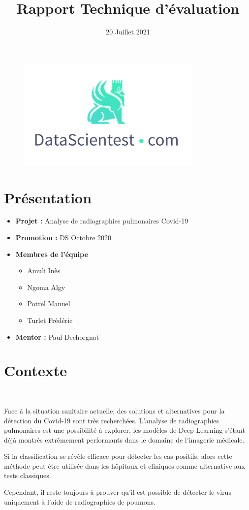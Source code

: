 \documentclass{article}
\title{Rapport Technique d'évaluation}
\date{20 Juillet 2021}
\begin{document}
\maketitle

\begin{figure}[!t] 
    \center 
    \includegraphics{banniere.png} 
\end{figure}

	\section*{Présentation}

	\begin{itemize}	
	
		\item \textbf{Projet :} Analyse de radiographies pulmonaires Covid-19
	
		\item \textbf{Promotion :} DS Octobre 2020
				
		\item \textbf{Membres de l'équipe}
			
		\begin{itemize}
			\item Amuli Inès
			\item Ngoma Algy
			\item Potrel Manuel
			\item Turlet Frédéric
		\end{itemize}
		
		\item \textbf{Mentor :} Paul Dechorgnat
		
	\end{itemize}
	
	\newpage	
	\section*{Contexte}
	
	~ 
	\par Face à la situation sanitaire actuelle, des solutions et alternatives pour la détection du Covid-19 sont très recherchées. L'analyse de radiographies pulmonaires est une possibilité à explorer, les modèles de Deep Learning s'étant déjà montrés extrêmement performants dans le domaine de l'imagerie médicale.
	\par Si la classification se révèle efficace pour détecter les cas positifs, alors cette méthode peut être utilisée dans les hôpitaux et cliniques comme alternative aux tests classiques.
	\par Cependant, il reste toujours à prouver qu'il est possible de détecter le virus uniquement à l'aide de radiographies de poumons.
	
\end{document}
